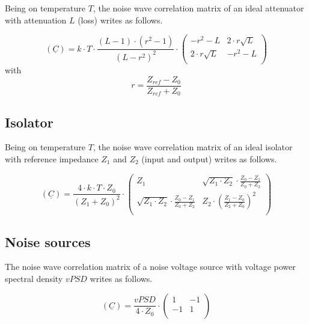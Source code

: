 \documentclass[10pt]{report}
\begin{document}
Being on temperature $T$, the noise wave correlation matrix of an
ideal attenuator with attenuation $L$ (loss) writes as follows.

\begin{equation}
(\underline{C}) = k\cdot T\cdot\frac{(L-1)\cdot(r^2-1)}{(L-r^2)^2}\cdot
\begin{pmatrix}
  -r^2-L           & 2\cdot r\sqrt{L}\\
  2\cdot r\sqrt{L} & -r^2-L\\
\end{pmatrix}
\end{equation}
with
\begin{equation}
r=\frac{Z_{ref}-Z_0}{Z_{ref}+Z_0}
\end{equation}


\subsection{Isolator}

Being on temperature $T$, the noise wave correlation matrix of an
ideal isolator with reference impedance $Z_1$ and $Z_2$ (input and
output) writes as follows.

\begin{equation}
(\underline{C}) = \frac{4\cdot k\cdot T\cdot Z_0}{(Z_1+Z_0)^2}\cdot
\begin{pmatrix}
  Z_1           & \sqrt{Z_1\cdot Z_2}\cdot\frac{Z_0-Z_1}{Z_0+Z_2}\\
  \sqrt{Z_1\cdot Z_2}\cdot\frac{Z_0-Z_1}{Z_0+Z_2} & Z_2\cdot\left(\frac{Z_1-Z_0}{Z_2+Z_0}\right)^2\\
\end{pmatrix}
\end{equation}


\subsection{Noise sources}

The noise wave correlation matrix of a noise voltage source with
voltage power spectral density $vPSD$ writes as follows.

\begin{equation}
(\underline{C}) = \frac{vPSD}{4\cdot Z_0}\cdot
\begin{pmatrix}
   1 & -1\\
  -1 &  1\\
\end{pmatrix}
\end{equation}
\end{document}
